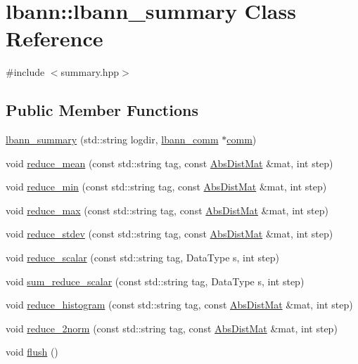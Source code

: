 \hypertarget{classlbann_1_1lbann__summary}{}\section{lbann\+:\+:lbann\+\_\+summary Class Reference}
\label{classlbann_1_1lbann__summary}


{\ttfamily \#include $<$summary.\+hpp$>$}

\subsection*{Public Member Functions}
\begin{DoxyCompactItemize}
\item 
\hyperlink{classlbann_1_1lbann__summary_a2891f67b732e92cc88e2c9849f911f57}{lbann\+\_\+summary} (std\+::string logdir, \hyperlink{classlbann_1_1lbann__comm}{lbann\+\_\+comm} $\ast$\hyperlink{file__io_8cpp_ab048c6f9fcbcfaa57ce68b00263dbebe}{comm})
\item 
void \hyperlink{classlbann_1_1lbann__summary_a8f63a3f2566d5d13e5ae24e727523c44}{reduce\+\_\+mean} (const std\+::string tag, const \hyperlink{base_8hpp_a9a697a504ae84010e7439ffec862b470}{Abs\+Dist\+Mat} \&mat, int step)
\item 
void \hyperlink{classlbann_1_1lbann__summary_afbf2df538879fcc4ea90a2bc6a6c2974}{reduce\+\_\+min} (const std\+::string tag, const \hyperlink{base_8hpp_a9a697a504ae84010e7439ffec862b470}{Abs\+Dist\+Mat} \&mat, int step)
\item 
void \hyperlink{classlbann_1_1lbann__summary_abebb44b0ea225aba2b98b24ccc8eb427}{reduce\+\_\+max} (const std\+::string tag, const \hyperlink{base_8hpp_a9a697a504ae84010e7439ffec862b470}{Abs\+Dist\+Mat} \&mat, int step)
\item 
void \hyperlink{classlbann_1_1lbann__summary_a65475f9a72f042b6ba09a2d33fda9293}{reduce\+\_\+stdev} (const std\+::string tag, const \hyperlink{base_8hpp_a9a697a504ae84010e7439ffec862b470}{Abs\+Dist\+Mat} \&mat, int step)
\item 
void \hyperlink{classlbann_1_1lbann__summary_a3e0b9aae1f80403a195567fd25ea2525}{reduce\+\_\+scalar} (const std\+::string tag, Data\+Type s, int step)
\item 
void \hyperlink{classlbann_1_1lbann__summary_a61dadb797450bca910d3673e03be95e0}{sum\+\_\+reduce\+\_\+scalar} (const std\+::string tag, Data\+Type s, int step)
\item 
void \hyperlink{classlbann_1_1lbann__summary_a6303fa270a3b7179f361b47418f812ef}{reduce\+\_\+histogram} (const std\+::string tag, const \hyperlink{base_8hpp_a9a697a504ae84010e7439ffec862b470}{Abs\+Dist\+Mat} \&mat, int step)
\item 
void \hyperlink{classlbann_1_1lbann__summary_a336143c9540d779381658beb4e841b73}{reduce\+\_\+2norm} (const std\+::string tag, const \hyperlink{base_8hpp_a9a697a504ae84010e7439ffec862b470}{Abs\+Dist\+Mat} \&mat, int step)
\item 
void \hyperlink{classlbann_1_1lbann__summary_afca72ec49f3e813b6563285a2153a5be}{flush} ()
\end{DoxyCompactItemize}


